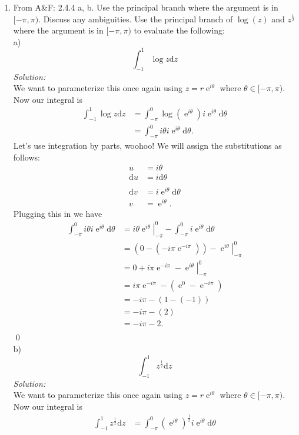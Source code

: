 \documentclass[10pt]{amsart}
\newcommand{\D}{\mathrm{d}}
\DeclareMathOperator{\E}{e}
\theoremstyle{nonumberplain}
\begin{document}
\begin{enumerate}[label={\bf {\arabic*}:}]
\item From A\&F: 2.4.4 a, b.
Use the principal branch where the argument is in $[-\pi,\pi)$.
Discuss any ambiguities. 
Use the principal branch of $\log(z)$ and $z^{\frac{1}{2}}$ where the argument is in $[-\pi,\pi)$ to evaluate the following: \\
a) $$\int_{-1}^{1}\log z \D z$$
\textit{Solution:} \\
We want to parameterize this once again using $z = r\E^{i\theta}$ where $\theta \in [-\pi,\pi)$. Now our integral is
\begin{align*}
\int_{-1}^{1}\log z \D z &= \int_{-\pi}^{0}\log \left(\E^{i\theta}\right) i \E^{i\theta} \D \theta \\
	&= \int_{-\pi}^{0} i\theta i \E^{i\theta} \D \theta.
\end{align*}
Let's use integration by parts, woohoo! We will assign the substitutions as follows:
\begin{align*}
u &= i\theta \\
\D u &= i \D \theta\\
\\
\D v &= i\E^{i \theta} \D \theta \\
v &= \E^{i \theta}.
\end{align*}
Plugging this in we have
\begin{align*}
\int_{-\pi}^{0} i\theta i \E^{i\theta} \D \theta &= \left. i\theta \E^{i\theta}\right|_{-\pi}^0 - \int_{-\pi}^0 i \E^{i \theta} \D \theta \\
	&= \left(0 - \left(-i\pi \E^{-i\pi}\right)\right) - \left. \E^{i\theta}\right|_{-\pi}^0 \\
	&= 0 + i\pi \E^{-i\pi} - \left. \E^{i\theta}\right|_{-\pi}^0 \\
	&= i\pi \E^{-i\pi} - \left(\E^{0} - \E^{-i\pi} \right) \\
	&= - i\pi - \left(1 - \left( - 1 \right) \right) \\
	&= - i\pi - \left(2\right) \\
	&= - i\pi - 2. \\
\end{align*}
\qed
\\
b) $$\int_{-1}^{1}z^{\frac{1}{2}} \D z$$
\textit{Solution:} \\
We want to parameterize this once again using $z = r\E^{i\theta}$ where $\theta \in [-\pi,\pi)$. Now our integral is
\begin{align*}
\int_{-1}^{1} z^{\frac{1}{2}} \D z &= \int_{-\pi}^{0} \left(\E^{i\theta}\right)^{\frac{1}{2}} i \E^{i\theta} \D \theta \\

\end{align*}
\end{enumerate}
\end{document}
